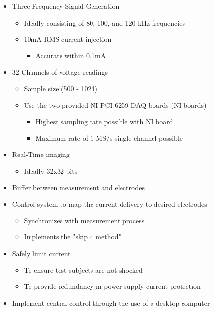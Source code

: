 \begin{itemize}
\item
  Three-Frequency Signal Generation

  \begin{itemize}
  \item
    Ideally consisting of 80, 100, and 120 kHz frequencies
  \item
    10mA RMS current injection

    \begin{itemize}
    \item
      Accurate within 0.1mA
    \end{itemize}
  \end{itemize}
\item
  32 Channels of voltage readings

  \begin{itemize}
  \item
    Sample size (500 - 1024)
  \item
    Use the two provided NI PCI-6259 DAQ boards (NI boards)

    \begin{itemize}
    \item
      Highest sampling rate possible with NI board
    \item
      Maximum rate of 1 MS/s single channel possible
    \end{itemize}
  \end{itemize}
\item
  Real-Time imaging

  \begin{itemize}
  \item
    Ideally 32x32 bits
  \end{itemize}
\item
  Buffer between measurement and electrodes
\item
  Control system to map the current delivery to desired electrodes

  \begin{itemize}
  \item
    Synchronizes with measurement process
  \item
    Implements the "skip 4 method"
  \end{itemize}
\item
  Safely limit current

  \begin{itemize}
  \item
    To ensure test subjects are not shocked
  \item
    To provide redundancy in power supply current protection
  \end{itemize}
\item
  Implement central control through the use of a desktop computer


\end{itemize}
